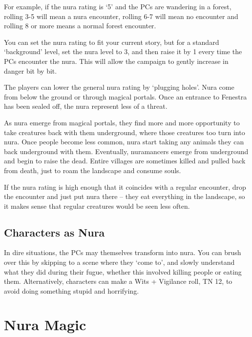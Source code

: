 \begin{multicols}{2}
For example, if the nura rating is `5' and the PCs are wandering in a forest, rolling 3-5 will mean a nura encounter, rolling 6-7 will mean no encounter and rolling 8 or more means a normal forest encounter.

You can set the nura rating to fit your current story, but for a standard `background' level, set the nura level to 3, and then raise it by 1 every time the PCs encounter the nura.
This will allow the campaign to gently increase in danger bit by bit.

The players can lower the general nura rating by `plugging holes'.
Nura come from below the ground or through magical portals.
Once an entrance to Fenestra has been sealed off, the nura represent less of a threat.

As nura emerge from magical portals, they find more and more opportunity to take creatures back with them underground, where those creatures too turn into nura.  Once people become less common, nura start taking any animals they can back underground with them.  Eventually, nuramancers emerge from underground and begin to raise the dead.  Entire villages are sometimes killed and pulled back from death, just to roam the landscape and consume souls.

If the nura rating is high enough that it coincides with a regular encounter, drop the encounter and just put nura there -- they eat everything in the landscape, so it makes sense that regular creatures would be seen less often.

\subsection{Characters as Nura}

In dire situations, the PCs may themselves transform into nura.
You can brush over this by skipping to a scene where they `come to', and slowly understand what they did during their fugue, whether this involved killing people or eating them.
Alternatively, characters can make a Wits + Vigilance roll, TN 12, to avoid doing something stupid and horrifying.

\end{multicols}

\section{Nura Magic}\label{saurecanta}

